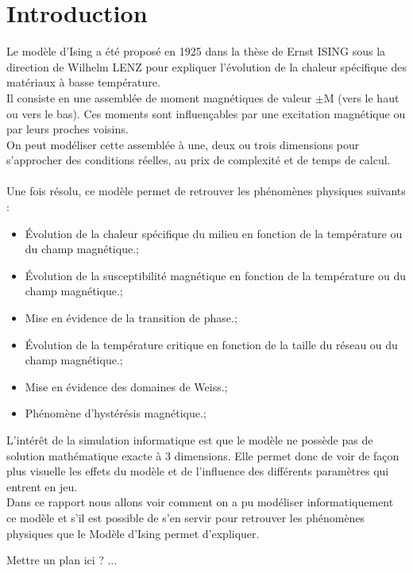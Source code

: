\section*{Introduction}

Le modèle d'Ising a été proposé en 1925 dans la thèse de Ernst ISING sous la direction de Wilhelm LENZ pour expliquer l'évolution de la chaleur spécifique des matériaux à basse température.\\
Il consiste en une assemblée de moment magnétiques de valeur $\pm$M (vers le haut ou vers le bas). Ces moments sont influençables par une excitation magnétique ou par leurs proches voisins.\\
On peut modéliser cette assemblée à une, deux ou trois dimensions pour s'approcher des conditions réelles, au prix de complexité et de temps de calcul.\\
\\
Une fois résolu, ce modèle permet de retrouver les phénomènes physiques suivants :\\
\begin{itemize}
\item Évolution de la chaleur spécifique du milieu en fonction de la température ou du champ magnétique.;
\item Évolution de la susceptibilité magnétique en fonction de la température ou du champ magnétique.;
\item Mise en évidence de la transition de phase.;
\item Évolution de la température critique en fonction de la taille du réseau ou du champ magnétique.;
\item Mise en évidence des domaines de Weiss.;
\item Phénomène d'hystérésis magnétique.;
\end{itemize}
\vspace{\parskip} %

L'intérêt de la simulation informatique est que le modèle ne possède pas de solution mathématique exacte à 3 dimensions. Elle permet donc de voir de façon plus visuelle les effets du modèle et de l'influence des différents paramètres qui entrent en jeu.\\
Dans ce rapport nous allons voir comment on a pu modéliser informatiquement ce modèle et s'il est possible de s'en servir pour retrouver les phénomènes physiques que le Modèle d'Ising permet d'expliquer.\vspace{\parskip}

Mettre un plan ici ? ...
